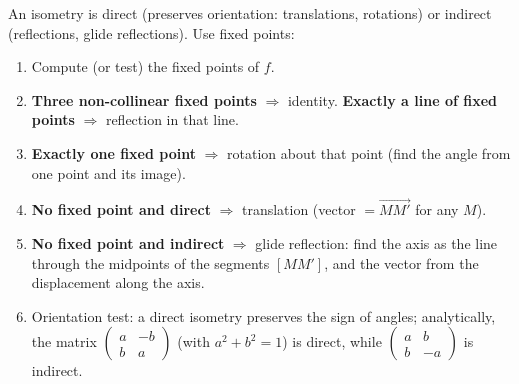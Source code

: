 \documentclass[11pt]{article}
\newcommand{\cle}[1]{{\popxbold\color{popdark}#1}}
\begin{document}
\begin{methode}
An isometry is \cle{direct} (preserves orientation: translations, rotations) or \cle{indirect} (reflections, glide reflections). Use fixed points:
\begin{enumerate}
\item Compute (or test) the fixed points of $f$.
\item \textbf{Three non-collinear fixed points} $\Rightarrow$ identity. \textbf{Exactly a line of fixed points} $\Rightarrow$ reflection in that line.
\item \textbf{Exactly one fixed point} $\Rightarrow$ rotation about that point (find the angle from one point and its image).
\item \textbf{No fixed point and direct} $\Rightarrow$ translation (vector $= \overrightarrow{MM'}$ for any $M$).
\item \textbf{No fixed point and indirect} $\Rightarrow$ glide reflection: find the axis as the line through the midpoints of the segments $[MM']$, and the vector from the displacement along the axis.
\item Orientation test: a direct isometry preserves the sign of angles; analytically, the matrix $\begin{pmatrix} a & -b \\ b & a \end{pmatrix}$ (with $a^2+b^2=1$) is direct, while $\begin{pmatrix} a & b \\ b & -a \end{pmatrix}$ is indirect.
\end{enumerate}
\end{methode}
\end{document}
